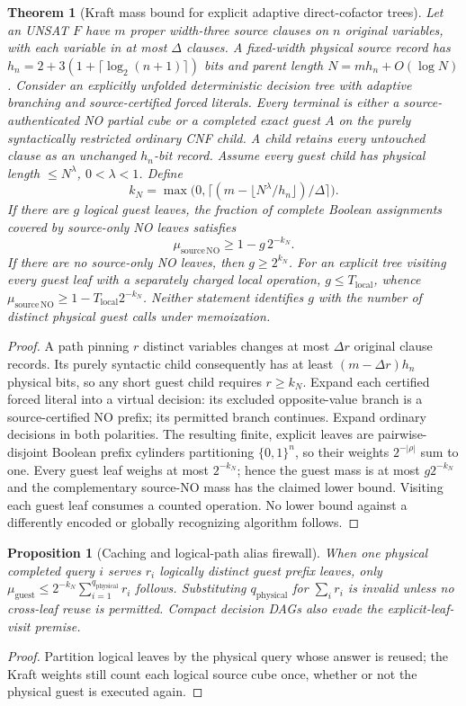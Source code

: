 \documentclass[11pt]{article}
\newtheorem{theorem}{Theorem}
\newtheorem{proposition}{Proposition}
\begin{document}
\begin{theorem}[Kraft mass bound for explicit adaptive direct-cofactor trees]
Let an UNSAT $F$ have $m$ proper width-three source clauses on $n$ original variables, with each variable in at most $\Delta$ clauses. A fixed-width physical source record has $h_n=2+3(1+\lceil\log_2(n+1)\rceil)$ bits and parent length $N=m h_n+O(\log N)$. Consider an explicitly unfolded deterministic decision tree with adaptive branching and source-certified forced literals. Every terminal is either a source-authenticated NO partial cube or a completed exact guest $A$ on the purely syntactically restricted ordinary CNF child. A child retains every untouched clause as an unchanged $h_n$-bit record. Assume every guest child has physical length $\le N^\lambda$, $0<\lambda<1$. Define
\[
k_N=\max\bigl(0,\lceil(m-\lfloor N^\lambda/h_n\rfloor)/\Delta\rceil\bigr).
\]
If there are $g$ \emph{logical guest leaves}, the fraction of complete Boolean assignments covered by source-only NO leaves satisfies
\[
 \boxed{\mu_{\mathrm{source\,NO}}\ge1-g\,2^{-k_N}}.
\]
If there are no source-only NO leaves, then $g\ge2^{k_N}$. For an explicit tree visiting every guest leaf with a separately charged local operation, $g\le T_{\mathrm{local}}$, whence $\mu_{\mathrm{source\,NO}}\ge1-T_{\mathrm{local}}2^{-k_N}$. Neither statement identifies $g$ with the number of distinct physical guest calls under memoization.
\end{theorem}
\begin{proof}
A path pinning $r$ distinct variables changes at most $\Delta r$ original clause records. Its purely syntactic child consequently has at least $(m-\Delta r)h_n$ physical bits, so any short guest child requires $r\ge k_N$. Expand each certified forced literal into a virtual decision: its excluded opposite-value branch is a source-certified NO prefix; its permitted branch continues. Expand ordinary decisions in both polarities. The resulting finite, explicit leaves are pairwise-disjoint Boolean prefix cylinders partitioning $\{0,1\}^n$, so their weights $2^{-|\rho|}$ sum to one. Every guest leaf weighs at most $2^{-k_N}$; hence the guest mass is at most $g2^{-k_N}$ and the complementary source-NO mass has the claimed lower bound. Visiting each guest leaf consumes a counted operation. No lower bound against a differently encoded or globally recognizing algorithm follows.
\end{proof}

\begin{proposition}[Caching and logical-path alias firewall]
When one physical completed query $i$ serves $r_i$ logically distinct guest prefix leaves, only
$\mu_{\mathrm{guest}}\le2^{-k_N}\sum_{i=1}^{q_{\mathrm{physical}}}r_i$
follows. Substituting $q_{\mathrm{physical}}$ for $\sum_i r_i$ is invalid unless no cross-leaf reuse is permitted. Compact decision DAGs also evade the explicit-leaf-visit premise.
\end{proposition}
\begin{proof}Partition logical leaves by the physical query whose answer is reused; the Kraft weights still count each logical source cube once, whether or not the physical guest is executed again.\end{proof}
\end{document}

